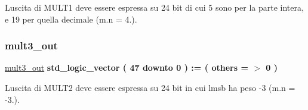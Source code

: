 L\textquotesingle{}uscita di M\+U\+L\+T1 deve essere espressa su 24 bit di cui 5 sono per la parte intera, e 19 per quella decimale (m.\+n = 4.). \mbox{\label{group___linear_regression_gae87513d13999dbb668a8ca5becdf44e1}} 
\subsubsection{\texorpdfstring{mult3\+\_\+out}{mult3\_out}}
{\footnotesize\ttfamily \hyperlink{group___linear_regression_gae87513d13999dbb668a8ca5becdf44e1}{mult3\+\_\+out} {\bfseries \textcolor{vhdlchar}{std\+\_\+logic\+\_\+vector}\textcolor{vhdlchar}{ }\textcolor{vhdlchar}{(}\textcolor{vhdlchar}{ }\textcolor{vhdlchar}{ } \textcolor{vhdldigit}{47} \textcolor{vhdlchar}{ }\textcolor{vhdlchar}{downto}\textcolor{vhdlchar}{ }\textcolor{vhdlchar}{ } \textcolor{vhdldigit}{0} \textcolor{vhdlchar}{ }\textcolor{vhdlchar}{)}\textcolor{vhdlchar}{ }\textcolor{vhdlchar}{ }\textcolor{vhdlchar}{ }\textcolor{vhdlchar}{\+:}\textcolor{vhdlchar}{=}\textcolor{vhdlchar}{ }\textcolor{vhdlchar}{(}\textcolor{vhdlchar}{ }\textcolor{vhdlchar}{ }\textcolor{vhdlchar}{others}\textcolor{vhdlchar}{ }\textcolor{vhdlchar}{ }\textcolor{vhdlchar}{=}\textcolor{vhdlchar}{ }\textcolor{vhdlchar}{$>$}\textcolor{vhdlchar}{ }\textcolor{vhdlchar}{\textquotesingle{}}\textcolor{vhdlchar}{ } \textcolor{vhdldigit}{0} \textcolor{vhdlchar}{ }\textcolor{vhdlchar}{\textquotesingle{}}\textcolor{vhdlchar}{ }\textcolor{vhdlchar}{)}\textcolor{vhdlchar}{ }} \hspace{0.3cm}{\ttfamily [Signal]}}

L\textquotesingle{}uscita di M\+U\+L\+T2 deve essere espressa su 24 bit in cui l\textquotesingle{}msb ha peso -\/3 (m.\+n = -\/3.). \mbox{\label{group___linear_regression_ga5a0832f93305c3e0a37293a00e17a538}} 
